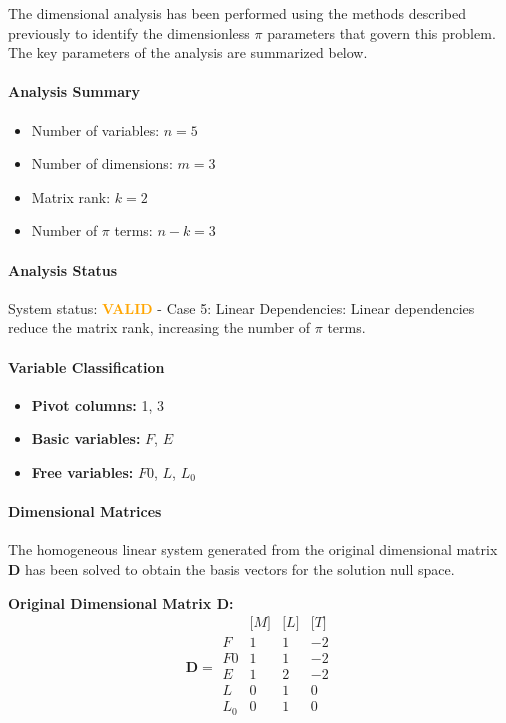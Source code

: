 The dimensional analysis has been performed using the methods described previously to identify the dimensionless $\pi$ parameters that govern this problem. The key parameters of the analysis are summarized below.

\paragraph{Analysis Summary}
\begin{itemize}
\item Number of variables: $n = 5$
\item Number of dimensions: $m = 3$
\item Matrix rank: $k = 2$
\item Number of $\pi$ terms: $n - k = 3$
\end{itemize}

\paragraph{Analysis Status}
System status: \textcolor{orange}{\textbf{VALID}} - Case 5: Linear Dependencies: Linear dependencies reduce the matrix rank, increasing the number of $\pi$ terms.


\paragraph{Variable Classification}
\begin{itemize}
\item \textbf{Pivot columns:} 1, 3
\item \textbf{Basic variables:} $F$, $E$
\item \textbf{Free variables:} $F0$, $L$, $L_0$
\end{itemize}

                \paragraph{Dimensional Matrices}
                The homogeneous linear system generated from the original dimensional matrix $\mathbf{D}$ has been solved to obtain the basis vectors for the solution null space.

                \textbf{Original Dimensional Matrix $\mathbf{D}$:}
                \[\mathbf{D} = \begin{array}{r|rrr}
                & \text{[}M\text{]} & \text{[}L\text{]} & \text{[}T\text{]} \\
                \hline
                F & 1 & 1 & -2 \\
F0 & 1 & 1 & -2 \\
E & 1 & 2 & -2 \\
L & 0 & 1 & 0 \\
L_0 & 0 & 1 & 0 \\

                \end{array}\]


